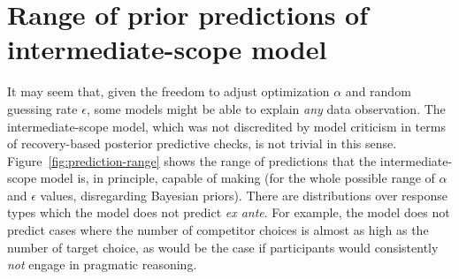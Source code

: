\documentclass[fleqn]{article}
\begin{document}
\section{Range of prior predictions of intermediate-scope model}
\label{sec:range-prior-pred}

It may seem that, given the freedom to adjust optimization $\alpha$ and random guessing rate $\epsilon$, some models might be able to explain \emph{any} data observation.
The intermediate-scope model, which was not discredited by model criticism in terms of recovery-based posterior predictive checks, is not trivial in this sense.
Figure~\ref{fig:prediction-range} shows the range of predictions that the intermediate-scope model is, in principle, capable of making (for the whole possible range of \(\alpha\) and \(\epsilon\) values, disregarding Bayesian priors).
There are distributions over response types which the model does not predict \emph{ex ante}.
For example, the model does not predict cases where the number of competitor choices is almost as high as the number of target choice, as would be the case if participants would consistently \emph{not} engage in pragmatic reasoning.
\end{document}
